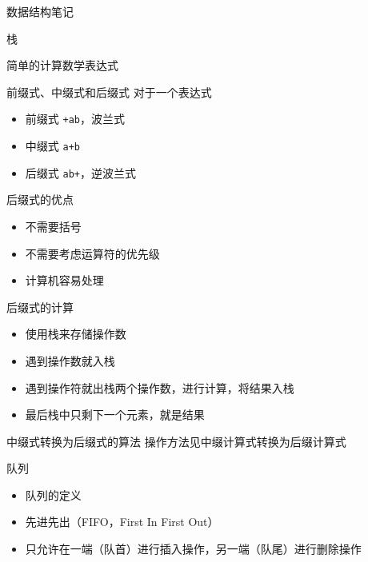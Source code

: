 \documentclass[
  ignorenonframetext,
]{beamer}
\providecommand{\tightlist}{%
  \setlength{\itemsep}{0pt}\setlength{\parskip}{0pt}}
\begin{document}
\begin{frame}[fragile]{数据结构笔记}
\begin{block}{栈}
\begin{block}{简单的计算数学表达式}
\protect{}\label{ux7b80ux5355ux7684ux8ba1ux7b97ux6570ux5b66ux8868ux8fbeux5f0f}
\begin{block}{前缀式、中缀式和后缀式}
\protect{}\label{ux524dux7f00ux5f0fux4e2dux7f00ux5f0fux548cux540eux7f00ux5f0f}
对于一个表达式 {}

\begin{itemize}
\tightlist
\item
  前缀式 \texttt{+ab}，波兰式
\item
  中缀式 \texttt{a+b}
\item
  后缀式 \texttt{ab+}，逆波兰式
\end{itemize}
\end{block}

\begin{block}{后缀式的优点}
\protect{}\label{ux540eux7f00ux5f0fux7684ux4f18ux70b9}
\begin{itemize}
\tightlist
\item
  不需要括号
\item
  不需要考虑运算符的优先级
\item
  计算机容易处理
\end{itemize}
\end{block}

\begin{block}{后缀式的计算}
\protect{}\label{ux540eux7f00ux5f0fux7684ux8ba1ux7b97}
\begin{itemize}
\tightlist
\item
  使用栈来存储操作数
\item
  遇到操作数就入栈
\item
  遇到操作符就出栈两个操作数，进行计算，将结果入栈
\item
  最后栈中只剩下一个元素，就是结果
\end{itemize}
\end{block}

\begin{block}{中缀式转换为后缀式的算法}
\protect{}\label{ux4e2dux7f00ux5f0fux8f6cux6362ux4e3aux540eux7f00ux5f0fux7684ux7b97ux6cd5}
操作方法见中缀计算式转换为后缀计算式
\end{block}
\end{block}
\end{block}

\begin{block}{队列}
\protect{}\label{ux961fux5217}
\begin{itemize}
\item
  队列的定义
\item
  先进先出（FIFO，First In First Out）
\item
  只允许在一端（队首）进行插入操作，另一端（队尾）进行删除操作
\end{itemize}



\end{block}
\end{frame}
\end{document}
